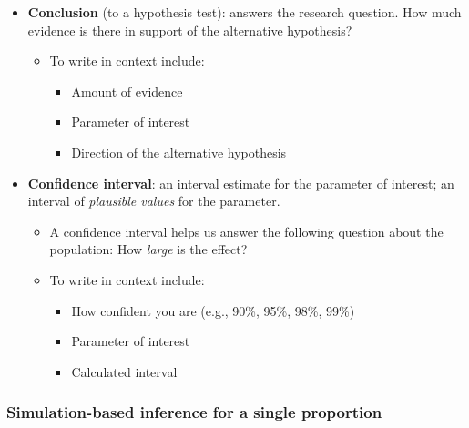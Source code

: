 \documentclass[
]{report}
\begin{document}
\begin{itemize}
\item
  \textbf{Conclusion} (to a hypothesis test): answers the research question. How much evidence is there in support of the alternative hypothesis?

  \begin{itemize}
  \item
    To write in context include:

    \begin{itemize}
    \item
      Amount of evidence
    \item
      Parameter of interest
    \item
      Direction of the alternative hypothesis
    \end{itemize}
  \end{itemize}
\item
  \textbf{Confidence interval}: an interval estimate for the parameter of interest; an interval of \emph{plausible values} for the parameter.

  \begin{itemize}
  \item
    A confidence interval helps us answer the following question about the population: How \emph{large} is the effect?
  \item
    To write in context include:

    \begin{itemize}
    \item
      How confident you are (e.g., 90\%, 95\%, 98\%, 99\%)
    \item
      Parameter of interest
    \item
      Calculated interval
    \end{itemize}
  \end{itemize}
\end{itemize}

\subsubsection{Simulation-based inference for a single proportion}\label{simulation-based-inference-for-a-single-proportion}
\end{document}
